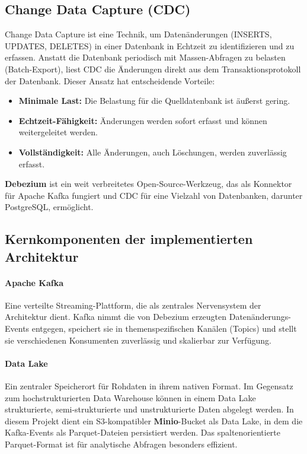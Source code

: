 \documentclass[
    12pt,               
    a4paper,        
    ngerman            
]{scrartcl}
\begin{document}
\subsection{Change Data Capture (CDC)}
\label{sec:cdc}
Change Data Capture ist eine Technik, um Datenänderungen (INSERTS, UPDATES, DELETES) in einer Datenbank in Echtzeit zu identifizieren und zu erfassen. Anstatt die Datenbank periodisch mit Massen-Abfragen zu belasten (Batch-Export), liest CDC die Änderungen direkt aus dem Transaktionsprotokoll der Datenbank. Dieser Ansatz hat entscheidende Vorteile:
\begin{itemize}
    \item \textbf{Minimale Last:} Die Belastung für die Quelldatenbank ist äußerst gering.
    \item \textbf{Echtzeit-Fähigkeit:} Änderungen werden sofort erfasst und können weitergeleitet werden.
    \item \textbf{Vollständigkeit:} Alle Änderungen, auch Löschungen, werden zuverlässig erfasst.
\end{itemize}
\textbf{Debezium} ist ein weit verbreitetes Open-Source-Werkzeug, das als Konnektor für Apache Kafka fungiert und CDC für eine Vielzahl von Datenbanken, darunter PostgreSQL, ermöglicht.

\subsection{Kernkomponenten der implementierten Architektur}
\label{sec:kernkomponenten}

\paragraph{Apache Kafka} Eine verteilte Streaming-Plattform, die als zentrales Nervensystem der Architektur dient. Kafka nimmt die von Debezium erzeugten Datenänderungs-Events entgegen, speichert sie in themenspezifischen Kanälen (Topics) und stellt sie verschiedenen Konsumenten zuverlässig und skalierbar zur Verfügung.

\paragraph{Data Lake} Ein zentraler Speicherort für Rohdaten in ihrem nativen Format. Im Gegensatz zum hochstrukturierten Data Warehouse können in einem Data Lake strukturierte, semi-strukturierte und unstrukturierte Daten abgelegt werden. In diesem Projekt dient ein S3-kompatibler \textbf{Minio}-Bucket als Data Lake, in dem die Kafka-Events als Parquet-Dateien persistiert werden. Das spaltenorientierte Parquet-Format ist für analytische Abfragen besonders effizient.
\end{document}
